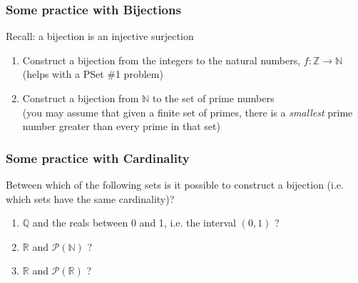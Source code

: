 \begin{frame}
\frametitle{Some practice with Bijections}

Recall: a bijection is an injective surjection 

\begin{enumerate}[<+->]

\item Construct a bijection from the integers to the natural numbers, $f: \mathbb{Z} \rightarrow \mathbb{N}$ (helps with a PSet \#1 problem)

\item Construct a bijection from $\mathbb{N}$ to the set of prime numbers \\ (you may assume that given a finite set of primes, there is a \textit{smallest} prime number greater than every prime in that set)




\end{enumerate}
\end{frame}


\begin{frame}
\frametitle{Some practice with Cardinality}
Between which of the following sets is it possible to construct a bijection (i.e. which sets have the same cardinality)?

\begin{enumerate}[<+->]

\item $\mathbb{Q}$ and the reals between 0 and 1, i.e. the interval $(0, 1)$ ?

\item $\mathbb{R}$ and $\mathscr{P}(\mathbb{N})$ ? 

\item $\mathbb{R}$ and $\mathscr{P}(\mathbb{R})$ ? 



\end{enumerate}

\end{frame}





